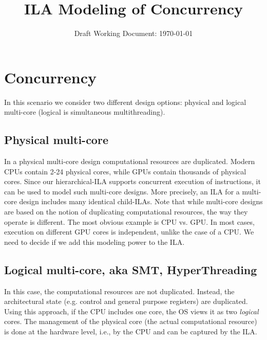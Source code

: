 \documentclass[letterpaper, 11 pt]{article}  %
\title{ILA Modeling of Concurrency}
\author{}
\date{Draft Working Document: \today}
\begin{document}
\maketitle

\providecommand{\bd}[0]{\mathbb{B}}
\providecommand{\st}[1]{\mathrm{#1}}
\providecommand{\ft}[1]{\mathtt{#1}}

\section*{Concurrency}

In this scenario we consider two different design options: physical and logical 
multi-core (logical is simultaneous multithreading). 

\subsection*{Physical multi-core} 
In a physical multi-core design computational resources are duplicated. 
Modern CPUs contain 2-24 physical cores, while GPUs contain thousands 
of physical cores. Since our hierarchical-ILA supports concurrent 
execution of instructions, it can be used to model such multi-core 
designs. More precisely, an ILA for a multi-core design includes 
many identical child-ILAs. Note that while multi-core designs are based 
on the notion of duplicating computational resources, the way they 
operate is different. The most obvious example is CPU vs. GPU. In most 
cases, execution on different GPU cores is independent, unlike the case 
of a CPU. We need to decide if we add this modeling power to the ILA.

\subsection*{Logical multi-core, aka SMT, HyperThreading}
In this case, the computational resources are not duplicated. 
Instead, the architectural state (e.g. control and general 
purpose registers) are duplicated. Using this approach, if 
the CPU includes one core, the OS views it as two \emph{logical}
 cores. The management of the physical core 
 (the actual computational resource) is done at the 
 hardware level, i.e., by the CPU and can be captured by the ILA.

%
%
\end{document}
